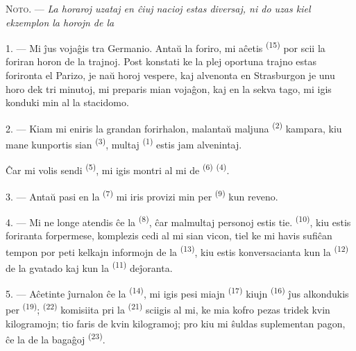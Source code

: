 
\VUsaut{4.0mm}
\VUsaut{2.4mm}
\VUsaut{3.4mm}
\textsc{Noto.} --- \textit{La horaroj uzataj en ĉiuj nacioj estas diversaj, ni
do uzas kiel ekzemplon la horojn de la} 

1. --- Mi ĵus vojaĝis tra Germanio. Antaŭ la foriro, mi aĉetis
 \textsuperscript{(15)} por scii la foriran horon de la
trajnoj. Post konstati ke la plej oportuna trajno estas forironta el Parizo, je
naŭ horoj vespere, kaj alvenonta en Strasburgon je unu horo dek tri minutoj, mi
preparis mian vojaĝon, kaj en la sekva tago, mi igis konduki min al la
stacidomo.

2. --- Kiam mi eniris la grandan forirhalon, malantaŭ maljuna 
\textsuperscript{(2)} kampara, kiu mane kunportis sian 
\textsuperscript{(3)}, multaj  \textsuperscript{(1)} estis jam
alvenintaj.

Ĉar mi volis sendi  \textsuperscript{(5)}, mi igis
montri al mi de  \textsuperscript{(6)}  \textsuperscript{(4)}.

3. --- Antaŭ pasi en la  \textsuperscript{(7)} mi iris
provizi min per  \textsuperscript{(9)} kun reveno.

4. --- Mi ne longe atendis ĉe la  \textsuperscript{(8)}, ĉar
malmultaj personoj estis tie.  \textsuperscript{(10)}, kiu estis
foriranta forpermese, komplezis cedi al mi sian vicon, tiel ke mi havis
sufiĉan tempon por peti kelkajn informojn de la 
\textsuperscript{(13)}, kiu estis konversacianta kun la 
\textsuperscript{(12)} de la gvatado kaj kun la 
\textsuperscript{(11)} deĵoranta.

\VUsaut{3.0mm}

5. --- Aĉetinte ĵurnalon ĉe la  \textsuperscript{(14)}, mi
igis pesi miajn  \textsuperscript{(17)} kiujn 
\textsuperscript{(16)} ĵus alkondukis per 
\textsuperscript{(19)};  \textsuperscript{(22)} komisiita pri
la  \textsuperscript{(21)} sciigis al mi, ke mia kofro pezas
tridek kvin kilogramojn; tio faris  de kvin kilogramoj; pro
kiu mi ŝuldas suplementan pagon, ĉe la  de la bagaĝoj
\textsuperscript{(23)}.

